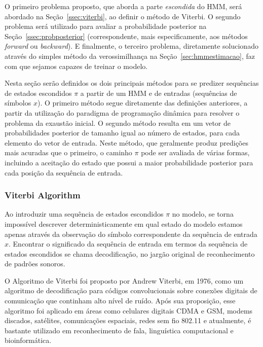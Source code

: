 O primeiro problema proposto, que aborda a parte \emph{escondida} do HMM, será abordado na Seção~\ref{ssec:viterbi}, ao definir o método de Viterbi. O segundo problema será utilizado para avaliar a probabilidade posterior na Seção~\ref{ssec:probposterior} (correspondente, mais especificamente, aos métodos \emph{forward} ou \emph{backward}). E finalmente, o terceiro problema, diretamente solucionado através do simples método da verossimilhança na Seção~\ref{sec:hmmestimacao}, faz com que sejamos capazes de treinar o modelo.

Nesta seção serão definidos os dois principais métodos para se predizer sequências de estados escondidos $ \pi $ a partir de um HMM e de entradas (sequências de símbolos $ x $). O primeiro método segue diretamente das definições anteriores, a partir da utilização do paradigma de programação dinâmica para resolver o problema da exaustão inicial. O segundo método resulta em um vetor de probabilidades posterior de tamanho igual ao número de estados, para cada elemento do vetor de entrada. Neste método, que geralmente produz predições mais acuradas que o primeiro, o caminho $ \pi $ pode ser avaliada de várias formas, incluindo a aceitação do estado que possui a maior probabilidade posterior para cada posição da sequência de entrada.

\subsubsection{Viterbi Algorithm}
\label{sec:viterbi.algorithm}

Ao introduzir uma sequência de estados escondidos $ \pi $ no modelo, se torna impossível descrever deterministicamente em qual estado do modelo estamos apenas através da observação do símbolo correspondente da sequência de entrada $ x $. Encontrar o significado da sequência de entrada em termos da sequência de estados escondidos se chama decodificação, no jargão original de reconhecimento de padrões sonoros.

O Algoritmo de Viterbi foi proposto por Andrew Viterbi, em 1976, como um algoritmo de decodificação para códigos convolucionais sobre conexões digitais de comunicação que continham alto nível de ruído. Após sua proposição, esse algoritmo foi aplicado em áreas como celulares digitais CDMA e GSM, modems discados, satélites, comunicações espaciais, redes sem fio 802.11 e atualmente, é bastante utilizado em reconhecimento de fala, linguística computacional e bioinformática.

